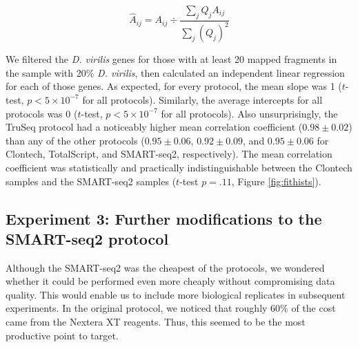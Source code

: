 \begin{equation} \label{eqn:norm}
\hat{A}_{ij} = A_{ij} \div \frac{\sum_j Q_j A_{ij}}{\sum_j (Q_j)^2}  
\end{equation}



We filtered the {\em D. virilis} genes for those with at least 20 mapped fragments in the sample with 20\% {\em D. virilis}, then calculated an independent linear regression for each of those genes.  As expected, for every protocol, the mean slope was 1 ($t$-test, $p<5\times10^{-7}$ for all protocols).  Similarly, the average intercepts for all protocols was 0 ($t$-test, $p<5\times10^{-7}$ for all protocols).  Also unsurprisingly, the TruSeq protocol had a noticeably higher mean correlation coefficient ($0.98 \pm 0.02$) than any of the other protocols ($0.95 \pm 0.06$, $0.92\pm0.09$, and $0.95 \pm 0.06$ for Clontech, TotalScript, and SMART-seq2, respectively). The mean correlation coefficient was statistically and practically indistinguishable between the Clontech samples and the SMART-seq2 samples ($t$-test $p = .11$, Figure \ref{fig:fithists}).


\subsection{Experiment 3: Further modifications to the SMART-seq2 protocol}

Although the SMART-seq2 was the cheapest of the protocols, we wondered whether it could be performed even more cheaply without compromising data quality.  This would enable us to include more biological replicates in subsequent experiments.  In the original protocol, we noticed that roughly 60\% of the cost came from the Nextera XT reagents.  Thus, this seemed to be the most productive point to target.  

